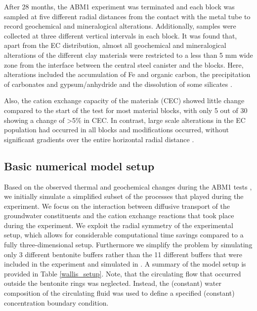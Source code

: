 After 28 months, the ABM1 experiment was terminated
and each block was sampled at five different radial distances from
the contact with the metal tube to record geochemical and
mineralogical alterations. Additionally, samples were collected at
three different vertical intervals in each block. It was found that,
apart from the EC distribution, almost all geochemical and mineralogical
alterations of the different clay materials were restricted to
a less than 5 mm wide zone from the interface between the central
steel canister and the blocks. Here, alterations included the accumulation
of Fe and organic carbon, the precipitation of carbonates
and gypsum/anhydride and the dissolution of some silicates
\citep{kaufhold_2013, wersin_2015}. 

Also, the cation exchange
capacity of the materials (CEC) showed little change compared to
the start of the test for most material blocks, with only 5 out of 30
showing a change of >5\% in CEC. 
In contrast, large scale alterations in the EC population 
had occurred in all blocks and modifications
occurred, without significant gradients over the entire horizontal
radial distance \citep{dohrmann_2013}.

\subsection[Basic numerical model setup]{Basic numerical model setup}

Based on the observed thermal and geochemical
changes during the ABM1 tests 
\citep{dohrmann_2013, kaufhold_2013, svensson_2011} 
, 
we initially simulate a simplified subset of the processes that 
played during the experiment. We focus on the interaction between diffusive transport 
of the groundwater constituents and the cation exchange reactions that took place 
during the experiment. We exploit the radial symmetry of the experimental setup, 
which allows for considerable computational time savings compared to a fully 
three-dimensional setup.
Furthermore we simplify the problem by simulating only 3 different bentonite buffers
rather than the 11 different buffers that were included in the experiment and simulated
in \cite{wallis_2016}. A summary of the model setup is provided in Table \ref{wallis_setup}.
Note, that the circulating flow that occurred outside the bentonite rings was neglected.
Instead, the (constant) water composition of the circulating fluid was used to define 
a specified (constant) concentration boundary condition.  

